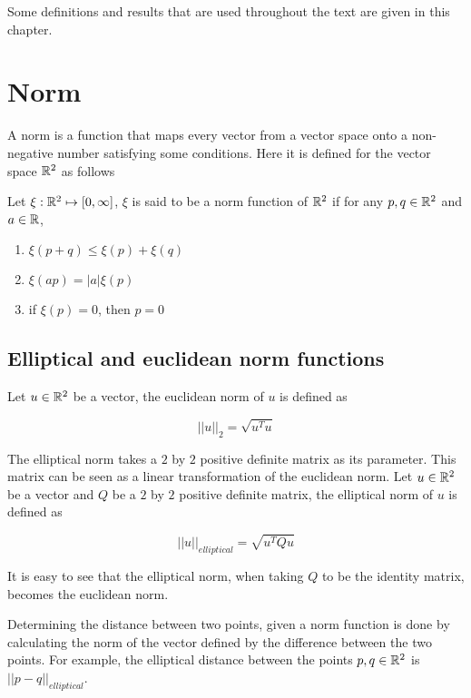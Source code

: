 Some definitions and results that are used throughout the text are given in this chapter.

\section{Norm}

A norm is a function that maps every vector from a vector space onto a non-negative number satisfying some conditions. Here it is defined for the vector space $\mathbb{R}^2$ as follows

\begin{definicao}
Let $\xi : \mathbb{R}^2 \mapsto [0, \infty]$, $\xi$ is said to be a norm function of $\mathbb{R}^2$ if for any $p, q \in \mathbb{R}^2$ and $a \in \mathbb{R}$,

\begin{enumerate}
    \item $\xi(p + q) \le \xi(p) + \xi(q)$
    \item $\xi(ap) = |a|\xi(p)$
    \item if $\xi(p)=0$, then $p=0$
\end{enumerate}

\end{definicao}

\subsection{Elliptical and euclidean norm functions}

Let $u \in \mathbb{R}^2$ be a vector, the euclidean norm of $u$ is defined as

\begin{equation}\label{eq:norm2}
||u||_2 = \sqrt{u^{T}u}
\end{equation}

The elliptical norm takes a $2$ by $2$ positive definite matrix as its parameter. This matrix can be seen as a linear transformation of the euclidean norm. Let $u \in \mathbb{R}^2$ be a vector and $Q$ be a $2$ by $2$ positive definite matrix, the elliptical norm of $u$ is defined as 

\begin{equation}
||u||_{elliptical} = \sqrt{u^{T}Qu}
\end{equation}

It is easy to see that the elliptical norm, when taking $Q$ to be the identity matrix, becomes the euclidean norm.

Determining the distance between two points, given a norm function is done by calculating the norm of the vector defined by the difference between the two points. For example, the elliptical distance between the points $p,q \in \mathbb{R}^2$ is $||p-q||_{elliptical}$.

